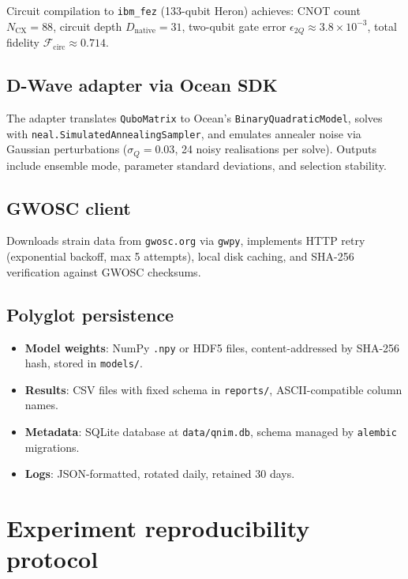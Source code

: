 \documentclass[11pt,a4paper, english]{book}
\theoremstyle{plain}
\theoremstyle{definition}
\numberwithin{equation}{chapter}
\numberwithin{figure}{chapter}
\numberwithin{table}{chapter}
\begin{document}
Circuit compilation to \texttt{ibm\_fez} (133-qubit Heron) achieves:
CNOT count $N_\mathrm{CX} = 88$,
circuit depth $D_\mathrm{native} = 31$,
two-qubit gate error $\epsilon_{2Q} \approx 3.8\times10^{-3}$,
total fidelity $\mathcal{F}_\mathrm{circ} \approx 0.714$.

\subsection{D-Wave adapter via Ocean SDK}
The adapter translates \texttt{QuboMatrix} to Ocean's
\texttt{BinaryQuadraticModel}, solves with
\texttt{neal.SimulatedAnnealingSampler}, and emulates annealer noise via
Gaussian perturbations ($\sigma_Q = 0.03$, 24 noisy realisations per solve).
Outputs include ensemble mode, parameter standard deviations, and
selection stability.

\subsection{GWOSC client}
Downloads strain data from \texttt{gwosc.org} via \texttt{gwpy}, implements
HTTP retry (exponential backoff, max 5 attempts), local disk caching, and
SHA-256 verification against GWOSC checksums.

\subsection{Polyglot persistence}
\begin{itemize}
  \item \textbf{Model weights}: NumPy \texttt{.npy} or HDF5 files,
        content-addressed by SHA-256 hash, stored in \texttt{models/}.
  \item \textbf{Results}: CSV files with fixed schema in \texttt{reports/},
        ASCII-compatible column names.
  \item \textbf{Metadata}: SQLite database at \texttt{data/qnim.db},
        schema managed by \texttt{alembic} migrations.
  \item \textbf{Logs}: JSON-formatted, rotated daily, retained 30 days.
\end{itemize}

\section{Experiment reproducibility protocol}
\label{app:sec:repro}
\end{document}
